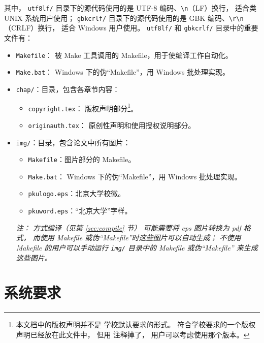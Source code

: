 	其中，%
	\verb|utf8lf/| 目录下的源代码使用的是 UTF-8 编码、\verb|\n|（LF）换行，
	适合类 UNIX 系统用户使用；%
	\verb|gbkcrlf/| 目录下的源代码使用的是 GBK 编码、\verb|\r\n|（CRLF）换行，
	适合 Windows 用户使用。%
	\verb|utf8lf/| 和 \verb|gbkcrlf/| 目录中的重要文件有：
	\begin{itemize}
		\item \verb|Makefile|：
			被 Make 工具调用的 Makefile，用于使编译工作自动化。
		\item \verb|Make.bat|：%
			Windows 下的伪“Makefile”，用 Windows 批处理实现。
		\item \verb|chap/|：目录，包含各章节内容：
		\begin{itemize}
			\item \verb|copyright.tex|：
				版权声明部分\footnote{%
					本文档中的版权声明并不是%
					学校默认要求的形式\cite{pku-copyright}。
					符合学校要求的一个版权声明已经放在此文件中，
					但用 \texttt{\string\iffalse{} ...\ \string\fi} %
					注释掉了，
					用户可以考虑使用那个版本。
				}。
			\item \verb|originauth.tex|：
				原创性声明和使用授权说明部分\cite{pku-originauth}。
		\end{itemize}
		\item \verb|img/|：目录，包含论文中所有图片：
		\begin{itemize}
			\item \verb|Makefile|：图片部分的 Makefile。
			\item \verb|Make.bat|：%
				Windows 下的伪“Makefile”，用 Windows 批处理实现。
			\item \verb|pkulogo.eps|：北京大学校徽。
			\item \verb|pkuword.eps|：“北京大学”字样。
		\end{itemize}
			\emph{%
				注：
				 方式编译（见第 \ref{sec:compile} 节）
				可能需要将 eps 图片转换为 pdf 格式，
				而使用 Makefile 或伪“Makefile”时这些图片可以自动生成；
				不使用 Makefile 的用户可以手动运行 %
				\texttt{img/} 目录中的 Makefile 或伪“Makefile”
				来生成这些图片。%
			}
	\end{itemize}

	\section{系统要求}\label{sec:req}

